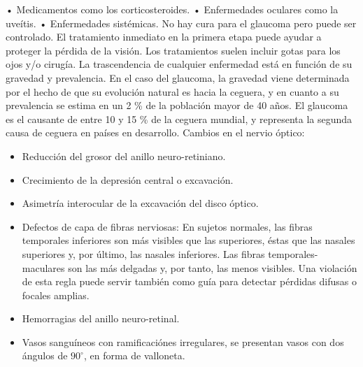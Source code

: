 \begin{itemize}
•	Medicamentos como los corticosteroides.
•	Enfermedades oculares como la uve\'itis.
•	Enfermedades sist\'emicas.
No hay cura para el glaucoma pero puede ser controlado. El tratamiento inmediato en la primera etapa puede ayudar a proteger la p\'erdida de la visi\'on. Los tratamientos suelen incluir gotas para los ojos y/o cirug\'ia. La trascendencia de cualquier enfermedad est\'a en funci\'on de su gravedad y prevalencia. En el caso del glaucoma, la gravedad viene determinada por el hecho de que su evoluci\'on natural es hacia la ceguera, y en cuanto a su prevalencia se estima en un 2 \% de la poblaci\'on mayor de 40 años. El glaucoma es el causante de entre 10 y 15 \% de la ceguera mundial, y representa la segunda causa de ceguera en pa\'ises en desarrollo.
Cambios en el nervio \'optico:
\begin{itemize}
	\item Reducci\'on del grosor del anillo neuro-retiniano.
	\item Crecimiento de la depresi\'on central o excavaci\'on.
	\item Asimetr\'ia interocular de la excavaci\'on del disco \'optico.
	\item Defectos de capa de fibras nerviosas: En sujetos normales, las fibras temporales inferiores son m\'as visibles que las superiores, \'estas que las nasales superiores y, por \'ultimo, las nasales inferiores. Las fibras temporales-maculares son las m\'as delgadas y, por tanto, las menos visibles. Una violaci\'on de esta regla puede servir tambi\'en como gu\'ia para detectar p\'erdidas difusas o focales amplias.
	\item Hemorragias del anillo neuro-retinal.
	\item Vasos sangu\'ineos con ramificaci\'ones irregulares, se presentan vasos con dos ángulos de $90^{\circ}$, en forma de valloneta.
\end{itemize}
\end{itemize}
 
